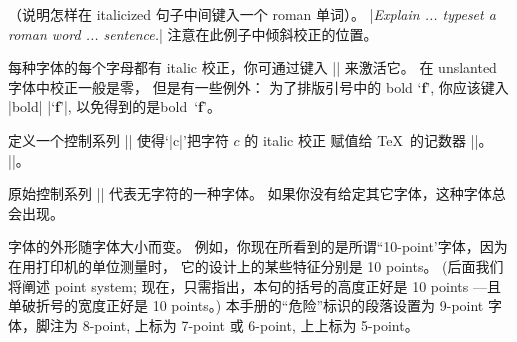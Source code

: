 （说明怎样在 italicized 句子中间键入一个 roman 单词）。
\answer |{\it Explain ... typeset a\/ {\rm roman} word ... sentence.}|
注意在此例子中倾斜校正的位置。

\danger 每种字体的每个字母都有 italic 校正，你可通过键入 |\/| 来激活它。%
在 unslanted 字体中校正一般是\hbox{零，} 但是有一些例外：
为了排版引号中的 bold `{\bf f\/}', 你应该键入 |bold| \hbox{|`{\bf f\/}'|},
以免得到的是\hbox{bold `{\bf f}'。}

\ddangerexercise 定义一个控制系列 |\ic| 使得`|\ic c|'把字符 $c$ 的 italic 校正%
赋值给 \TeX\ 的记数器 ||。
\answer |\def\ic#1{\setbox0=\hbox{#1\/}\dimen0=\wd0|\parbreak
|\setbox0=\hbox{#1}\advance\dimen0 by -\wd0}|。

\ddanger 原始控制系列 |\nullfont| 代表无字符的一种字体。%
如果你没有给定其它字体，这种字体总会\hbox{出现。}

\1字体的外形随字体大小而变。%
例如，你现在所看到的是所谓``10-point'字体，因为在用打印机的单位测量时，
它的设计上的某些特征分别是 10 points。%
(后面我们将阐述 point system; 现在，只需指出，本句的括号的高度正好是 10 points%
---且单破折号的宽度正好是 10 points。)
本手册的``危险''标识的段落设置为 9-point 字体，脚注为 8-point,
上标为 7-point 或 6-point, 上上标为 5-point。

